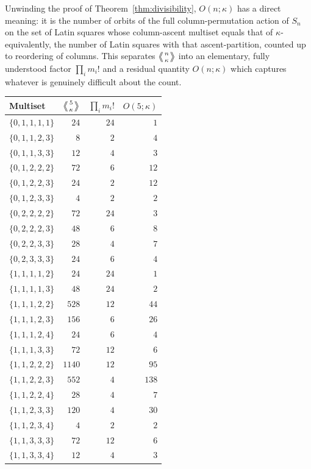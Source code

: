 \documentclass[11pt]{amsart}
\newcommand{\LE}[1]{\left\langle\!\!\left\langle #1 \right\rangle\!\!\right\rangle}
\begin{document}
Unwinding the proof of Theorem~\ref{thm:divisibility}, $O(n;\kappa)$ has a direct meaning: it is the number of orbits of the full column-permutation action of $S_n$ on the set of Latin squares whose column-ascent multiset equals that of $\kappa$-equivalently, the number of Latin squares with that ascent-partition, counted up to reordering of columns. This separates $\LE{n\atop\kappa}$ into an elementary, fully understood factor $\prod_i m_i!$ and a residual quantity $O(n;\kappa)$ which captures whatever is genuinely difficult about the count.

\begin{table}[h]
\centering
\small
\begin{tabular}{@{}l r r r@{}}
\toprule
Multiset & $\LE{5\atop\kappa}$ & $\prod_i m_i!$ & $O(5;\kappa)$ \\
\midrule
$\{0,1,1,1,1\}$ & $24$ & $24$ & $1$ \\
$\{0,1,1,2,3\}$ & $8$ & $2$ & $4$ \\
$\{0,1,1,3,3\}$ & $12$ & $4$ & $3$ \\
$\{0,1,2,2,2\}$ & $72$ & $6$ & $12$ \\
$\{0,1,2,2,3\}$ & $24$ & $2$ & $12$ \\
$\{0,1,2,3,3\}$ & $4$ & $2$ & $2$ \\
$\{0,2,2,2,2\}$ & $72$ & $24$ & $3$ \\
$\{0,2,2,2,3\}$ & $48$ & $6$ & $8$ \\
$\{0,2,2,3,3\}$ & $28$ & $4$ & $7$ \\
$\{0,2,3,3,3\}$ & $24$ & $6$ & $4$ \\
$\{1,1,1,1,2\}$ & $24$ & $24$ & $1$ \\
$\{1,1,1,1,3\}$ & $48$ & $24$ & $2$ \\
$\{1,1,1,2,2\}$ & $528$ & $12$ & $44$ \\
$\{1,1,1,2,3\}$ & $156$ & $6$ & $26$ \\
$\{1,1,1,2,4\}$ & $24$ & $6$ & $4$ \\
$\{1,1,1,3,3\}$ & $72$ & $12$ & $6$ \\
$\{1,1,2,2,2\}$ & $1140$ & $12$ & $95$ \\
$\{1,1,2,2,3\}$ & $552$ & $4$ & $138$ \\
$\{1,1,2,2,4\}$ & $28$ & $4$ & $7$ \\
$\{1,1,2,3,3\}$ & $120$ & $4$ & $30$ \\
$\{1,1,2,3,4\}$ & $4$ & $2$ & $2$ \\
$\{1,1,3,3,3\}$ & $72$ & $12$ & $6$ \\
$\{1,1,3,3,4\}$ & $12$ & $4$ & $3$ \\

\end{tabular}
\end{table}
\end{document}
